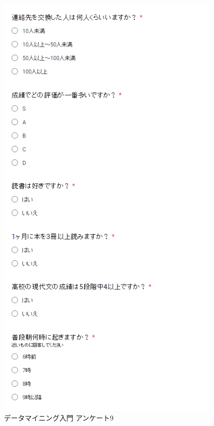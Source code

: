 \begin{figure}[p]
\centering
\includegraphics[width=11cm]{forms12.PNG}
\caption{データマイニング入門 アンケート9}\label{サンプル図}
\end{figure}


